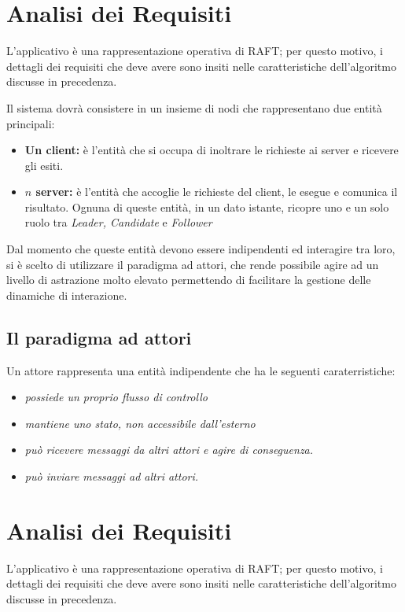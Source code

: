 \section{Analisi dei Requisiti} \label{Actors}
L'applicativo è una rappresentazione operativa di RAFT; per questo motivo, i dettagli dei requisiti che deve avere sono insiti nelle caratteristiche dell'algoritmo discusse in precedenza. 

Il sistema dovrà consistere in un insieme di nodi che rappresentano due entità principali:
	\begin{itemize}
		\item \textbf{Un client:} è l'entità che si occupa di inoltrare le richieste ai server e ricevere gli esiti.
		\item \textbf{$n$ server:} è l'entità che accoglie le richieste del client, le esegue e comunica il risultato. Ognuna di queste entità, in un dato istante, ricopre uno e un solo ruolo tra \textit{Leader, Candidate} e \textit{Follower}
	\end{itemize}

Dal momento che queste entità devono essere indipendenti ed interagire tra loro, si è scelto di utilizzare il paradigma ad attori, che rende possibile agire ad un livello di astrazione molto elevato permettendo di facilitare la gestione delle dinamiche di interazione.


	\subsection{Il paradigma ad attori}
	Un attore rappresenta una entità indipendente che ha le seguenti caraterristiche:
	\begin{itemize}
		\item \emph{possiede un proprio flusso di controllo}
		\item \emph{mantiene uno stato, non accessibile dall'esterno}
		\item \emph{può ricevere messaggi da altri attori e agire di conseguenza.}
		\item \emph{può inviare messaggi ad altri attori.}
	\end{itemize}
\section{Analisi dei Requisiti} \label{Actors}
L'applicativo è una rappresentazione operativa di RAFT; per questo motivo, i dettagli dei requisiti che deve avere sono insiti nelle caratteristiche dell'algoritmo discusse in precedenza. 

